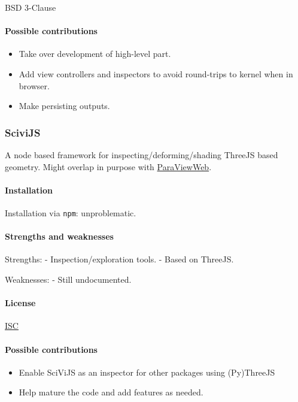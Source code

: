 BSD 3-Clause

\paragraph{Possible contributions}

\begin{itemize}
\tightlist
\item
  Take over development of high-level part.
\item
  Add view controllers and inspectors to avoid round-trips to kernel
  when in browser.
\item
  Make persisting outputs.
\end{itemize}

\subsubsection{SciviJS}

A node based framework for inspecting/deforming/shading ThreeJS based
geometry. Might overlap in purpose with
\href{https://kitware.github.io/paraviewweb/}{ParaViewWeb}.

\paragraph{Installation}

Installation via \texttt{npm}: unproblematic.

\paragraph{Strengths and weaknesses}

Strengths: - Inspection/exploration tools. - Based on ThreeJS.

Weaknesses: - Still undocumented.

\paragraph{License}

\href{https://opensource.org/licenses/ISC}{ISC}

\paragraph{Possible contributions}

\begin{itemize}
\tightlist
\item
  Enable SciViJS as an inspector for other packages using (Py)ThreeJS
\item
  Help mature the code and add features as needed.
\end{itemize}


